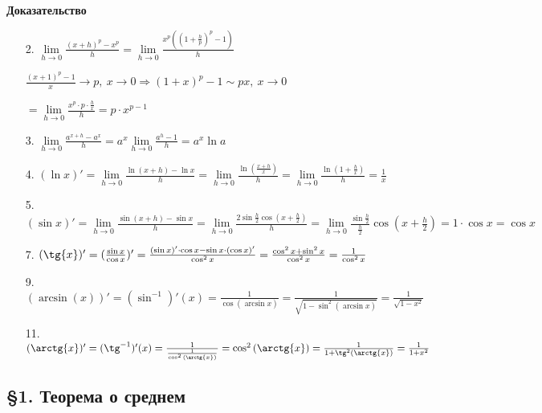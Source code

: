 \documentclass[14pt, letter paper]{article}
\begin{document}
\begin{center}
    \textbf{Доказательство}
\end{center}

\begin{enumerate}
    \item[2.] $\lim\limits_{h \rightarrow 0} \frac{(x + h)^p - x^p}{h} = \lim\limits_{h \rightarrow 0} \frac{x^p((1 + \frac{h}{p})^p - 1)}{h}$
    
    $\frac{(x + 1)^p - 1}{x} \rightarrow p,\ x \rightarrow 0 \Rightarrow (1 + x)^p - 1 \sim px,\ x \rightarrow 0$

    $= \lim\limits_{h \rightarrow 0} \frac{x^p \cdot p \cdot \frac{h}{x}}{h} = p \cdot x^{p-1}$

    \item[3.] $\lim\limits_{h \rightarrow 0} \frac{a^{x + h} - a^x}{h} = a^x \lim\limits_{h \rightarrow 0} \frac{a^h - 1}{h} = a^x \ln{a}$
    
    \item[4.] $(\ln{x})' = \lim\limits_{h \rightarrow 0} \frac{\ln{(x + h)} - \ln{x}}{h} = \lim\limits_{h \rightarrow 0} \frac{\ln{(\frac{x + h}{x})}}{h} = \lim\limits_{h \rightarrow 0} \frac{\ln{(1 + \frac{h}{x})}}{h} = \frac{1}{x}$
    
    \item[5.] $(\sin{x})' = \lim\limits_{h \rightarrow 0} \frac{\sin{(x + h)} - \sin{x}}{h} = \lim\limits_{h \rightarrow 0} \frac{2 \sin{\frac{h}{2}} \cos{(x + \frac{h}{2})}}{h} = \lim\limits_{h \rightarrow 0} \frac{\sin{\frac{h}{2}}}{\frac{h}{2}} \cos{(x + \frac{h}{2})} = 1 \cdot \cos{x} = \cos{x}$
    
    \item[7.] $(\tg{x})' = (\frac{\sin{x}}{\cos{x}})' = \frac{(\sin{x})' \cdot \cos{x} - \sin{x} \cdot (\cos{x})'}{\cos^2{x}} = \frac{\cos^2{x} + \sin^2{x}}{\cos^2{x}} = \frac{1}{\cos^2{x}}$
    
    \item[9.] $(\arcsin(x))' = (\sin^{-1})'(x) = \frac{1}{\cos{(\arcsin{x})}} = \frac{1}{\sqrt{1 - \sin^2{(\arcsin{x})}}} = \frac{1}{\sqrt{1 - x^2}}$
    
    \item[11.] $(\arctg{x})' = (\tg^{-1})'(x) = \frac{1}{\frac{1}{\cos^2{(\arctg{x})}}} = \cos^2{(\arctg{x})} = \frac{1}{1 + \tg^2{(\arctg{x})}} = \frac{1}{1 + x^2}$
\end{enumerate}

\begin{center}
    \subsection*{\S 1. Теорема о среднем}
\end{center}
\end{document}
